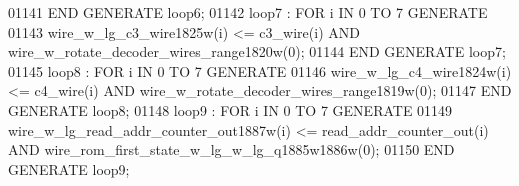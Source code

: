 \begin{DoxyCode}
{01141     \textcolor{keywordflow}{END} \textcolor{keywordflow}{GENERATE} \textcolor{vhdlchar}{loop6};
01142     \textcolor{vhdlchar}{loop7} \textcolor{vhdlchar}{:} \textcolor{keywordflow}{FOR} \textcolor{vhdlchar}{i} \textcolor{keywordflow}{IN} \textcolor{vhdllogic}{}\textcolor{vhdllogic}{0} \textcolor{keywordflow}{TO} \textcolor{vhdllogic}{}\textcolor{vhdllogic}{7} \textcolor{keywordflow}{GENERATE} 
01143         \textcolor{vhdlchar}{wire_w_lg_c3_wire1825w}\textcolor{vhdlchar}{(}\textcolor{vhdlchar}{i}\textcolor{vhdlchar}{)} \textcolor{vhdlchar}{<=} \textcolor{vhdlchar}{c3_wire}\textcolor{vhdlchar}{(}\textcolor{vhdlchar}{i}\textcolor{vhdlchar}{)} \textcolor{keywordflow}{AND} \textcolor{vhdlchar}{
      wire_w_rotate_decoder_wires_range1820w}\textcolor{vhdlchar}{(}\textcolor{vhdllogic}{}\textcolor{vhdllogic}{0}\textcolor{vhdlchar}{)};
01144     \textcolor{keywordflow}{END} \textcolor{keywordflow}{GENERATE} \textcolor{vhdlchar}{loop7};
01145     \textcolor{vhdlchar}{loop8} \textcolor{vhdlchar}{:} \textcolor{keywordflow}{FOR} \textcolor{vhdlchar}{i} \textcolor{keywordflow}{IN} \textcolor{vhdllogic}{}\textcolor{vhdllogic}{0} \textcolor{keywordflow}{TO} \textcolor{vhdllogic}{}\textcolor{vhdllogic}{7} \textcolor{keywordflow}{GENERATE} 
01146         \textcolor{vhdlchar}{wire_w_lg_c4_wire1824w}\textcolor{vhdlchar}{(}\textcolor{vhdlchar}{i}\textcolor{vhdlchar}{)} \textcolor{vhdlchar}{<=} \textcolor{vhdlchar}{c4_wire}\textcolor{vhdlchar}{(}\textcolor{vhdlchar}{i}\textcolor{vhdlchar}{)} \textcolor{keywordflow}{AND} \textcolor{vhdlchar}{
      wire_w_rotate_decoder_wires_range1819w}\textcolor{vhdlchar}{(}\textcolor{vhdllogic}{}\textcolor{vhdllogic}{0}\textcolor{vhdlchar}{)};
01147     \textcolor{keywordflow}{END} \textcolor{keywordflow}{GENERATE} \textcolor{vhdlchar}{loop8};
01148     \textcolor{vhdlchar}{loop9} \textcolor{vhdlchar}{:} \textcolor{keywordflow}{FOR} \textcolor{vhdlchar}{i} \textcolor{keywordflow}{IN} \textcolor{vhdllogic}{}\textcolor{vhdllogic}{0} \textcolor{keywordflow}{TO} \textcolor{vhdllogic}{}\textcolor{vhdllogic}{7} \textcolor{keywordflow}{GENERATE} 
01149         \textcolor{vhdlchar}{wire_w_lg_read_addr_counter_out1887w}\textcolor{vhdlchar}{(}\textcolor{vhdlchar}{i}\textcolor{vhdlchar}{)} \textcolor{vhdlchar}{<=} \textcolor{vhdlchar}{read_addr_counter_out}\textcolor{vhdlchar}{(}\textcolor{vhdlchar}{i}\textcolor{vhdlchar}{)} \textcolor{keywordflow}{AND} \textcolor{vhdlchar}{
      wire_rom_first_state_w_lg_w_lg_q1885w1886w}\textcolor{vhdlchar}{(}\textcolor{vhdllogic}{}\textcolor{vhdllogic}{0}\textcolor{vhdlchar}{)};
01150     \textcolor{keywordflow}{END} \textcolor{keywordflow}{GENERATE} \textcolor{vhdlchar}{loop9};
}
\end{DoxyCode}
